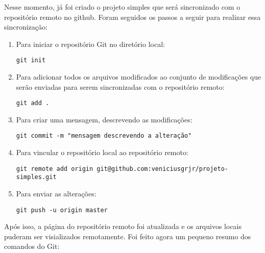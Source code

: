 Nesse momento, já foi criado o projeto simples que será 
sincronizado com o repositório remoto no github. Foram  
seguidos os passos a seguir para realizar essa sincronização:
\begin{enumerate}
   \item Para iniciar o repositório Git no diretório local:
      \begin{lstlisting}
git init
      \end{lstlisting}
      
   \item Para adicionar todos os arquivos modificados ao 
   conjunto de modificações que serão enviadas para serem 
   sincronizadas com o repositório remoto: 
      \begin{lstlisting}
git add . 
      \end{lstlisting}
   
   \item Para criar uma mensagem, descrevendo as modificações: 
      \begin{lstlisting}
git commit -m "mensagem descrevendo a alteração"
      \end{lstlisting}
      
   \item Para vincular o repositório local ao repositório remoto: 
      \begin{lstlisting}
git remote add origin git@github.com:veniciusgrjr/projeto-simples.git
      \end{lstlisting}
      
    \item Para enviar as alterações: 
      \begin{lstlisting}
git push -u origin master
      \end{lstlisting}
 \end{enumerate}
Após isso, a página do repositório remoto foi atualizada e os 
arquivos locais puderam ser visializados remotamente. Foi feito 
agora um pequeno resumo dos comandos do Git:
